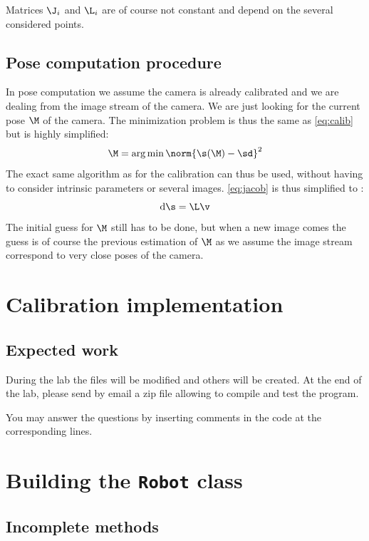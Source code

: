 \documentclass{ecnreport}
\begin{document}
Matrices $\J_i$ and $\L_i$ are of course not constant and depend on the several considered points. 

\subsection{Pose computation procedure}

In pose computation we assume the camera is already calibrated and we are dealing from the image stream of the camera.
We are just looking for the current pose $\M$ of the camera.
The minimization problem is thus the same as \eqref{eq:calib} but is highly simplified:
\begin{equation}\label{eq:pose comp}
\M = \arg\min \norm{\s(\M) - \sd}^2
\end{equation}The exact same algorithm as for the calibration can thus be used, without having to consider intrinsic parameters or several images.
\eqref{eq:jacob} is thus simplified to :
\begin{equation}
 \der\s =  \L\v
\end{equation}
The initial guess for $\M$ still has to be done, but when a new image comes the guess is of course the previous estimation of $\M$ as we assume the image stream 
correspond to very close poses of the camera.


\section{Calibration implementation}


\subsection{Expected work}

During the lab the files will be modified and others will be created.
At the end of the lab, please send by email a zip file allowing to compile and test the program.

You may answer the questions by inserting comments in the code at the corresponding lines.



\newpage

\section{Building the \texttt{Robot} class}

\subsection{Incomplete methods}
\end{document}
